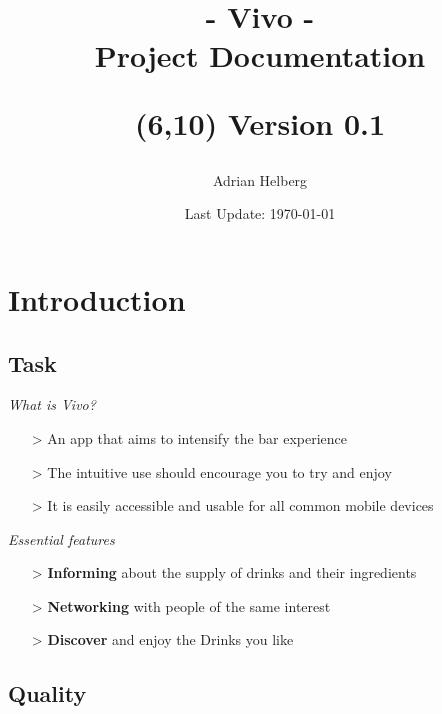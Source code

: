 \documentclass[11pt]{article}
\title{
    \fontsize{38pt}{42pt}\selectfont - \textbf{Vivo} -\\ Project Documentation
    \author{Adrian Helberg}
    \date{Last Update: \today}
    \begin{textblock}{4}(6,10)
    \Huge Version 0.1
    \end{textblock}
}
\begin{document}
    \maketitle
    \newpage
    \tableofcontents
    \newpage

    \section{Introduction}

    \subsection{Task}

    \textit{What is Vivo?}
    \begin{itemize}
        \item[>] An app that aims to intensify the bar experience
        \item[>] The intuitive use should encourage you to try and enjoy
        \item[>] It is easily accessible and usable for all common mobile devices
    \end{itemize}
    \textit{Essential features}
    \begin{itemize}
        \item[>] \textbf{Informing} about the supply of drinks and their ingredients
        \item[>] \textbf{Networking} with people of the same interest
        \item[>] \textbf{Discover} and enjoy the Drinks you like
    \end{itemize}

    \subsection{Quality}
\end{document}
